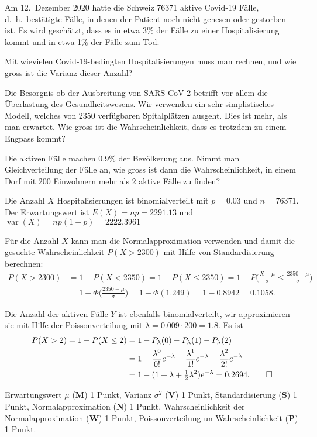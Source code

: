 Am 12.~Dezember 2020 hatte die Schweiz 76371 aktive Covid-19 Fälle,
d.~h.~bestätigte Fälle, in denen der Patient noch nicht genesen oder
gestorben ist.
Es wird geschätzt, dass es in etwa 3\% der Fälle zu einer Hospitalisierung
kommt und in etwa 1\% der Fälle zum Tod.
\begin{teilaufgaben}
\item
Mit wievielen Covid-19-bedingten Hospitalisierungen muss man rechnen, und
wie gross ist die Varianz dieser Anzahl?
\item
Die Besorgnis ob der Ausbreitung von SARS-CoV-2 betrifft vor allem die
Überlastung des Gesundheitswesens.
Wir verwenden ein sehr simplistisches Modell, welches von 2350 
verfügbaren Spitalplätzen ausgeht.
Dies ist mehr, als man erwartet.
Wie gross ist die Wahrscheinlichkeit, dass es trotzdem zu einem Engpass kommt?
\item
Die aktiven Fälle machen 0.9\% der Bevölkerung aus.
Nimmt man Gleichverteilung der Fälle an, wie gross ist dann die
Wahrscheinlichkeit, in einem Dorf mit 200 Einwohnern mehr als 2 
aktive Fälle zu finden?
\end{teilaufgaben}

\begin{loesung}
\begin{teilaufgaben}
\item
Die Anzahl $X$ Hospitalisierungen ist binomialverteilt mit $p=0.03$ und
$n=76371$.
Der Erwartungswert ist $E(X)=np = 2291.13$ und
$\operatorname{var}(X)=np(1-p)=2222.3961$
\item
Für die Anzahl $X$ kann man die Normalapproximation verwenden und damit
die gesuchte Wahrscheinlichkeit $P(X>2300)$ mit Hilfe von Standardisierung
berechnen:
\begin{align*}
P(X>2300)
&=
1-P(X<2350)
=
1-P(X\le 2350)
=
1-P\biggl(\frac{X-\mu}{\sigma}\le \frac{2350-\mu}{\sigma}\biggr)
\\
&=
1-\Phi\biggl(\frac{2350-\mu}{\sigma}\biggr)
=
1-\Phi(1.249)
=
1-0.8942
=
0.1058.
\end{align*}
\item
Die Anzahl der aktiven Fälle $Y$ ist ebenfalls binomialverteilt,
wir approximieren sie mit Hilfe der Poissonverteilung mit
$\lambda = 0.009\cdot 200 = 1.8$.
Es ist
\begin{align*}
P(X > 2)
=
1-P(X\le 2)
&=
1-P_{\lambda}(0)-P_{\lambda}(1)-P_{\lambda}(2)
\\
&=
1-
\frac{\lambda^0}{0!}e^{-\lambda}
-
\frac{\lambda^1}{1!}e^{-\lambda}
-
\frac{\lambda^2}{2!}e^{-\lambda}
\\
&=
1-(1+\lambda+{\textstyle\frac12}\lambda^2)e^{-\lambda}
=
0.2694.
\qedhere
\end{align*}
\end{teilaufgaben}
\end{loesung}

\begin{bewertung}
Erwartungswert $\mu$ ({\bf M}) 1 Punkt,
Varianz $\sigma^2$ ({\bf V}) 1 Punkt,
Standardisierung ({\bf S}) 1 Punkt,
Normalapproximation ({\bf N}) 1 Punkt,
Wahrscheinlichkeit der Normalapproximation ({\bf W}) 1 Punkt,
Poissonverteilung un Wahrscheinlichkeit ({\bf P}) 1 Punkt.
\end{bewertung}


